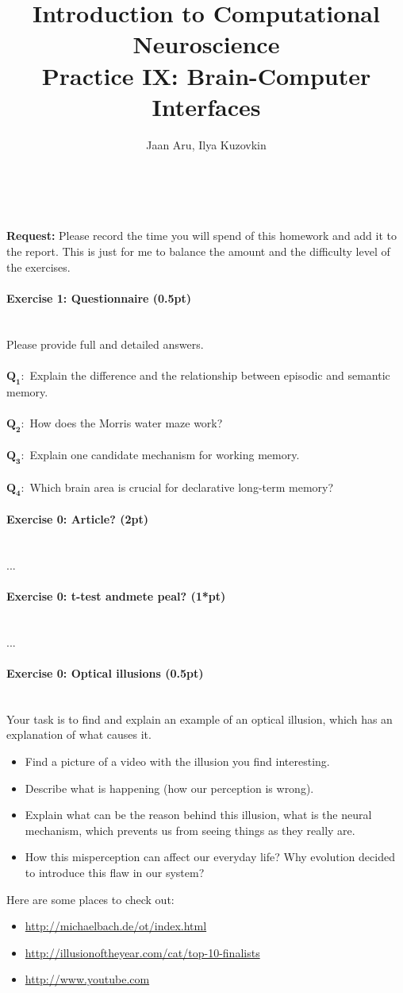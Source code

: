 \documentclass[a4paper,11pt]{article}
\author{\large{Jaan Aru, Ilya Kuzovkin}}
\title{\huge{Introduction to Computational Neuroscience}\\\LARGE{Practice IX: Brain-Computer Interfaces}}
\newenvironment{exercise}[3]{\paragraph{Exercise #1: #2 (#3pt)}\ \\}{
\medskip}
\newcommand{\question}[2]{\setlength\parindent{0mm}\ \\$\mathbf{Q_{#1}:}$ #2\ \\}
\begin{document}
\maketitle


%
%
\ \\

\ \\
\textbf{Request:} Please record the time you will spend of this homework and add it to the report. This is just for me to balance the amount and the difficulty level of the exercises.

%
% 
%
\begin{exercise}{1}{Questionnaire}{0.5}
Please provide full and detailed answers.\\
\question{1}{Explain the difference and the relationship between episodic and semantic memory.}
\question{2}{How does the Morris water maze work?}
\question{3}{Explain one candidate mechanism for working memory.}
\question{4}{Which brain area is crucial for declarative long-term memory?}
\end{exercise}


%
% 
%
\begin{exercise}{0}{Article?}{2}
...
\end{exercise}


%
%
\begin{exercise}{0}{t-test andmete peal?}{1*}
...
\end{exercise}


%
%
\begin{exercise}{0}{Optical illusions}{0.5}
Your task is to find and explain an example of an optical illusion, which has an explanation of what causes it.
\begin{itemize}
\itemsep 0em
	\item Find a picture of a video with the illusion you find interesting.
	\item Describe what is happening (how our perception is wrong).
	\item Explain what can be the reason behind this illusion, what is the neural mechanism, which prevents us from seeing things as they really are.
	\item How this misperception can affect our everyday life? Why evolution decided to introduce this flaw in our system?
\end{itemize}
Here are some places to check out:
\begin{itemize}
\itemsep 0em
	\item \url{http://michaelbach.de/ot/index.html}
	\item \url{http://illusionoftheyear.com/cat/top-10-finalists}
	\item \url{http://www.youtube.com}
\end{itemize}
\end{exercise}
\end{document}
